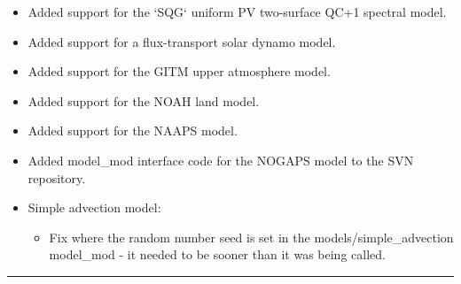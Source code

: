 \documentclass[letterpaper,10pt,english]{sphinxmanual}
\begin{document}
\begin{itemize}
\item {} 
Added support for the `SQG` uniform PV two-surface QC+1 spectral
model.

\item {} 
Added support for a flux-transport solar dynamo model.

\item {} 
Added support for the GITM upper atmosphere model.

\item {} 
Added support for the NOAH land model.

\item {} 
Added support for the NAAPS model.

\item {} 
Added model\_mod interface code for the NOGAPS model to the SVN
repository.

\item {} 
Simple advection model:
\begin{itemize}
\item {} 
Fix where the random number seed is set in the
models/simple\_advection model\_mod - it needed to be sooner
than it was being called.

\end{itemize}

\end{itemize}


\bigskip\hrule{}\bigskip
\end{document}
